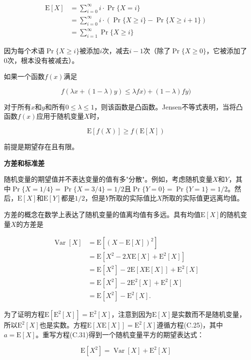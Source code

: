 \documentclass[lang=cn,newtx,10pt,scheme=chinese]{elegantbook}
\begin{document}
$$
\begin{aligned}
\mathrm{E}[X] & =\sum_{i=0}^{\infty} i \cdot \operatorname{Pr}\{X=i\} \\
& =\sum_{i=0}^{\infty} i \cdot(\operatorname{Pr}\{X \geq i\}-\operatorname{Pr}\{X \geq i+1\}) \\
& =\sum_{i=1}^{\infty} \operatorname{Pr}\{X \geq i\}
\end{aligned}
$$

因为每个术语$\operatorname{Pr}\{X \geq i\}$被添加$i$次，减去$i-1$次（除了$\operatorname{Pr}\{X \geq 0\}$，它被添加了0次，根本没有被减去）。

如果一个函数$f(x)$满足

$$
f(\lambda x+(1-\lambda) y) \leq \lambda f x)+(1-\lambda) f y)
$$

对于所有$x$和$y$和所有$0 \leq \lambda \leq 1$，则该函数是凸函数。Jensen不等式表明，当将凸函数$f(x)$应用于随机变量$X$时，

$$
\mathrm{E}[f(X)] \geq f(\mathrm{E}[X])
$$

前提是期望存在且有限。

\textbf{方差和标准差}

随机变量的期望值并不表达变量的值有多"分散"。例如，考虑随机变量$X$和$Y$，其中$\operatorname{Pr}\{X=1 / 4\}=\operatorname{Pr}\{X=3 / 4\}=1 / 2$且$\operatorname{Pr}\{Y=0\}=\operatorname{Pr}\{Y=1\}=1 / 2$。然后，$\mathrm{E}[X]$和$\mathrm{E}[Y]$都是$1 / 2$，但是$Y$所取的实际值比$X$所取的实际值更远离均值。

方差的概念在数学上表达了随机变量的值离均值有多远。具有均值$\mathrm{E}[X]$的随机变量$X$的方差是

$$
\begin{aligned}
\operatorname{Var}[X] & =\mathrm{E}[(X-\mathrm{E}[X])^2] \\
& =\mathrm{E}[X^2-2 X \mathrm{E}[X]+\mathrm{E}^2[X]] \\
& =\mathrm{E}[X^2]-2 \mathrm{E}[X \mathrm{E}[X]]+\mathrm{E}^2[X] \\
& =\mathrm{E}[X^2]-2 \mathrm{E}^2[X]+\mathrm{E}^2[X] \\
& =\mathrm{E}[X^2]-\mathrm{E}^2[X] .
\end{aligned}
$$

为了证明方程$\mathrm{E}[\mathrm{E}^2[X]]=\mathrm{E}^2[X]$，注意到因为$\mathrm{E}[X]$是实数而不是随机变量，所以$\mathrm{E}^2[X]$也是实数。方程$\mathrm{E}[X \mathrm{E}[X]]=\mathrm{E}^2[X]$遵循方程(C.25)，其中$a=\mathrm{E}[X]$。重写方程(C.31)得到一个随机变量平方的期望表达式：

$$
\mathrm{E}[X^2]=\operatorname{Var}[X]+\mathrm{E}^2[X]
$$
\end{document}
